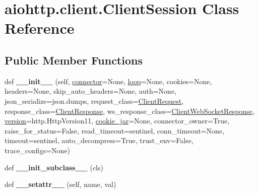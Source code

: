 \hypertarget{classaiohttp_1_1client_1_1_client_session}{}\section{aiohttp.\+client.\+Client\+Session Class Reference}
\label{classaiohttp_1_1client_1_1_client_session}
\subsection*{Public Member Functions}
\begin{DoxyCompactItemize}
\item 
\mbox{\label{classaiohttp_1_1client_1_1_client_session_acf6fe783850711f244b3be064ac0b974}} 
def {\bfseries \+\_\+\+\_\+init\+\_\+\+\_\+} (self, \hyperlink{classaiohttp_1_1client_1_1_client_session_a41272d6a492699baf7aefb308a9fb7ea}{connector}=None, \hyperlink{classaiohttp_1_1client_1_1_client_session_addc1e7d257a7abfd78eef10b9c7f4fb6}{loop}=None, cookies=None, headers=None, skip\+\_\+auto\+\_\+headers=None, auth=None, json\+\_\+serialize=json.\+dumps, request\+\_\+class=\hyperlink{classaiohttp_1_1client__reqrep_1_1_client_request}{Client\+Request}, response\+\_\+class=\hyperlink{classaiohttp_1_1client__reqrep_1_1_client_response}{Client\+Response}, ws\+\_\+response\+\_\+class=\hyperlink{classaiohttp_1_1client__ws_1_1_client_web_socket_response}{Client\+Web\+Socket\+Response}, \hyperlink{classaiohttp_1_1client_1_1_client_session_a5f6ab7a25c8e88005e78477f0f1b572b}{version}=http.\+Http\+Version11, \hyperlink{classaiohttp_1_1client_1_1_client_session_aa9bee3ce9c62ca05d848f03329315618}{cookie\+\_\+jar}=None, connector\+\_\+owner=True, raise\+\_\+for\+\_\+status=False, read\+\_\+timeout=sentinel, conn\+\_\+timeout=None, timeout=sentinel, auto\+\_\+decompress=True, trust\+\_\+env=False, trace\+\_\+configs=None)
\item 
\mbox{\label{classaiohttp_1_1client_1_1_client_session_a248867d6f6ccfaf76aa508f962e0f75c}} 
def {\bfseries \+\_\+\+\_\+init\+\_\+subclass\+\_\+\+\_\+} (cls)
\item 
\mbox{\label{classaiohttp_1_1client_1_1_client_session_a7dc8d43dfbcb1ca6c2d9cc3d1268dc4b}} 
def {\bfseries \+\_\+\+\_\+setattr\+\_\+\+\_\+} (self, name, val)

\end{DoxyCompactItemize}
